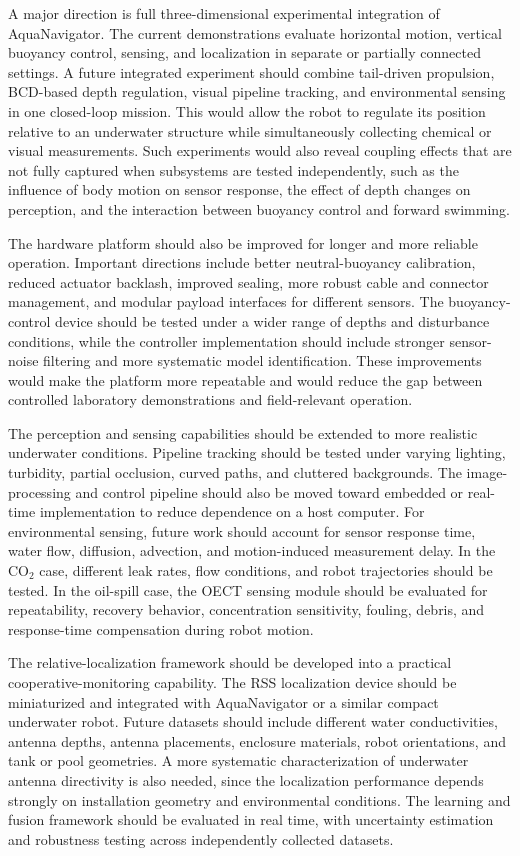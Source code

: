 \documentclass{uhcoethesis}
\begin{document}
A major direction is full three-dimensional experimental integration of AquaNavigator. The current demonstrations evaluate horizontal motion, vertical buoyancy control, sensing, and localization in separate or partially connected settings. A future integrated experiment should combine tail-driven propulsion, BCD-based depth regulation, visual pipeline tracking, and environmental sensing in one closed-loop mission. This would allow the robot to regulate its position relative to an underwater structure while simultaneously collecting chemical or visual measurements. Such experiments would also reveal coupling effects that are not fully captured when subsystems are tested independently, such as the influence of body motion on sensor response, the effect of depth changes on perception, and the interaction between buoyancy control and forward swimming.

The hardware platform should also be improved for longer and more reliable operation. Important directions include better neutral-buoyancy calibration, reduced actuator backlash, improved sealing, more robust cable and connector management, and modular payload interfaces for different sensors. The buoyancy-control device should be tested under a wider range of depths and disturbance conditions, while the controller implementation should include stronger sensor-noise filtering and more systematic model identification. These improvements would make the platform more repeatable and would reduce the gap between controlled laboratory demonstrations and field-relevant operation.

The perception and sensing capabilities should be extended to more realistic underwater conditions. Pipeline tracking should be tested under varying lighting, turbidity, partial occlusion, curved paths, and cluttered backgrounds. The image-processing and control pipeline should also be moved toward embedded or real-time implementation to reduce dependence on a host computer. For environmental sensing, future work should account for sensor response time, water flow, diffusion, advection, and motion-induced measurement delay. In the \mbox{CO$_2$} case, different leak rates, flow conditions, and robot trajectories should be tested. In the oil-spill case, the OECT sensing module should be evaluated for repeatability, recovery behavior, concentration sensitivity, fouling, debris, and response-time compensation during robot motion.

The relative-localization framework should be developed into a practical cooperative-monitoring capability. The RSS localization device should be miniaturized and integrated with AquaNavigator or a similar compact underwater robot. Future datasets should include different water conductivities, antenna depths, antenna placements, enclosure materials, robot orientations, and tank or pool geometries. A more systematic characterization of underwater antenna directivity is also needed, since the localization performance depends strongly on installation geometry and environmental conditions. The learning and fusion framework should be evaluated in real time, with uncertainty estimation and robustness testing across independently collected datasets.
\end{document}
